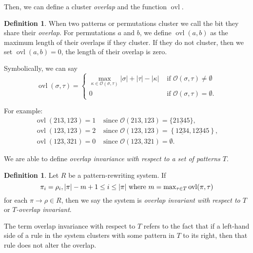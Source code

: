 \documentclass[a4paper, 11pt, english]{article}
\newcommand{\patternrule}{ \to \!}
\theoremstyle{definition}
\newtheorem{definition}[theorem]{Definition}
\newcommand{\Ocal}{\mathcal{O}}
\DeclareMathOperator{\ovl}{ovl}
\begin{document}
Then, we can define a cluster \emph{overlap} and the function $\ovl$.
\begin{definition}
  When two patterns or permutations cluster we call the bit they share their \emph{overlap}.
  For permutations $a$ and $b$, we define $\ovl(a,b)$ as the maximum length of their overlaps if they 
  cluster. If they do not cluster, then we set $\ovl(a,b)=0$, the length of their overlap is zero.

  Symbolically, we can say
  \[
    \ovl(\sigma, \tau) = 
      \begin{cases}
        \max\limits_{\kappa \in \Ocal(\sigma, \tau)} |\sigma| + |\tau| - |\kappa| & \mbox{ if } \Ocal(\sigma, \tau) \neq \emptyset \\
        0 & \text{ if $\Ocal(\sigma, \tau) = \emptyset$}.
      \end{cases}
  \]

  For example:
  \begin{align*}
    \ovl(213, 123) = 1 & \text{ since } \Ocal(213, 123) = \{ 21\underline{3}45 \}, \\
    \ovl(123, 123) = 2 & \text{ since } \Ocal(123, 123) = \left\{ 1\underline{23}4, 12\underline{3}45
  \right\}, \\
  \ovl(123, 321) = 0 & \text{ since } \Ocal(123, 321) = \emptyset.
  \end{align*}
\end{definition}

We are able to define \emph{overlap invariance with respect to a set of patterns $T$}.
\begin{definition}
    Let $R$ be a pattern-rewriting system. If
    \[
        \pi_i = \rho_i, |\pi|-m+1 \leq i \leq |\pi| \  \textnormal{where}
        \ m = \max\nolimits_{\tau \in T} \ovl(\pi, \tau)
    \]
    for each $\pi \patternrule \rho \in R$,
    then we say the system is \emph{overlap invariant with respect to $T$} or \emph{$T$-overlap
    invariant}.
\end{definition}

The term overlap invariance with respect to $T$ refers to the fact that if a left-hand side of a rule in the system clusters
with some pattern in $T$ to its right, then that rule does not alter the overlap.
\end{document}
